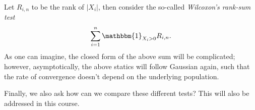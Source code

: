 \begin{eg}
	Let \(R_{i, n} \) to be the rank of \(\vert X_i \vert \), then consider the so-called \emph{Wilcoxon's rank-sum test}
	\[
		\sum_{i=1}^{n} \mathbbm{1}_{X_i > 0} R_{i, n}.
	\]
	As one can imagine, the closed form of the above sum will be complicated; however, asymptotically, the above statics will follow Gaussian again, such that the rate of convergence doesn't depend on the underlying population.
\end{eg}

Finally, we also ask how can we compare these different tests? This will also be addressed in this course.
